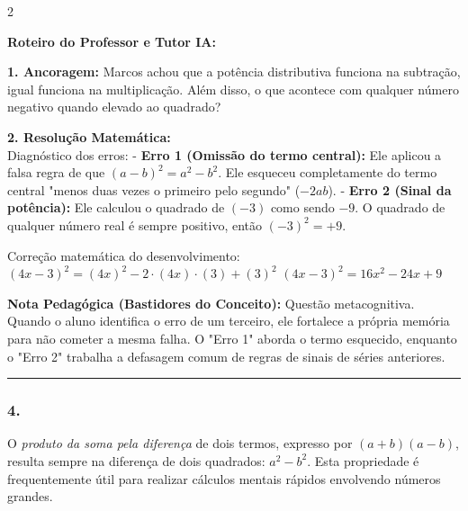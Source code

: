\begin{multicols*}{2}
\ifgabarito
    \begin{tcolorbox}[colback=CorTitUm!5, colframe=CorTitUm, boxrule=1pt, arc=4pt, left=6pt, right=6pt, top=6pt, bottom=6pt]
    \small\textbf{\textcolor{CorTitUm}{Roteiro do Professor e Tutor IA:}}\par\vspace{0.1cm}
    \color{CinzaEscuro}
    \textbf{1. Ancoragem:} Marcos achou que a potência distributiva funciona na subtração, igual funciona na multiplicação. Além disso, o que acontece com qualquer número negativo quando elevado ao quadrado?\par\vspace{0.1cm}
    \textbf{2. Resolução Matemática:}\\
    Diagnóstico dos erros:
    - \textbf{Erro 1 (Omissão do termo central):} Ele aplicou a falsa regra de que $ (a - b)^2 = a^2 - b^2 $. Ele esqueceu completamente do termo central "menos duas vezes o primeiro pelo segundo" ($ -2ab $).
    - \textbf{Erro 2 (Sinal da potência):} Ele calculou o quadrado de $ (-3) $ como sendo $ -9 $. O quadrado de qualquer número real é sempre positivo, então $ (-3)^2 = +9 $.
    
    Correção matemática do desenvolvimento:
    $ (4x - 3)^2 = (4x)^2 - 2 \cdot (4x) \cdot (3) + (3)^2 $
    $ (4x - 3)^2 = 16x^2 - 24x + 9 $
    \end{tcolorbox}
    \vspace{0.15cm}
    
    \begin{boxexplicacao}
    \textbf{Nota Pedagógica (Bastidores do Conceito):} Questão metacognitiva. Quando o aluno identifica o erro de um terceiro, ele fortalece a própria memória para não cometer a mesma falha. O "Erro 1" aborda o termo esquecido, enquanto o "Erro 2" trabalha a defasagem comum de regras de sinais de séries anteriores.
    \end{boxexplicacao}
\fi

\par\vspace{\espacoQuestao}

\noindent\textcolor{CorLinha}{\rule{\linewidth}{0.5pt}} 
\par\vspace{\espacoPreQuestao}
\subsubsection*{4.} 
\begin{enunciadoLiteral}
O \textit{produto da soma pela diferença} de dois termos, expresso por $ (a + b)(a - b) $, resulta sempre na diferença de dois quadrados: $ a^2 - b^2 $. Esta propriedade é frequentemente útil para realizar cálculos mentais rápidos envolvendo números grandes.


\end{enunciadoLiteral}
\end{multicols*}
